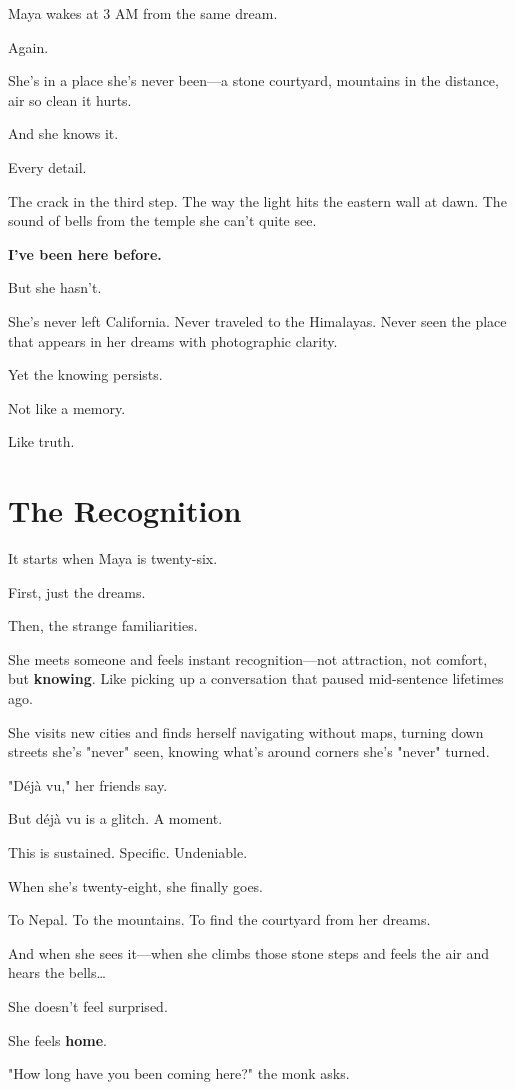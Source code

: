 \documentclass[11pt,twoside]{book}
\begin{document}
Maya wakes at 3 AM from the same dream.

Again.

She's in a place she's never been—a stone courtyard, mountains in the distance, air so clean it hurts.

And she knows it.

Every detail.

The crack in the third step. The way the light hits the eastern wall at dawn. The sound of bells from the temple she can't quite see.

\textbf{I've been here before.}

But she hasn't.

She's never left California. Never traveled to the Himalayas. Never seen the place that appears in her dreams with photographic clarity.

Yet the knowing persists.

Not like a memory.

Like truth.

\section*{The Recognition}

It starts when Maya is twenty-six.

First, just the dreams.

Then, the strange familiarities.

She meets someone and feels instant recognition—not attraction, not comfort, but \textbf{knowing}. Like picking up a conversation that paused mid-sentence lifetimes ago.

She visits new cities and finds herself navigating without maps, turning down streets she's "never" seen, knowing what's around corners she's "never" turned.

"Déjà vu," her friends say.

But déjà vu is a glitch. A moment.

This is sustained. Specific. Undeniable.

When she's twenty-eight, she finally goes.

To Nepal. To the mountains. To find the courtyard from her dreams.

And when she sees it—when she climbs those stone steps and feels the air and hears the bells\ldots{}

She doesn't feel surprised.

She feels \textbf{home}.

"How long have you been coming here?" the monk asks.
\end{document}
